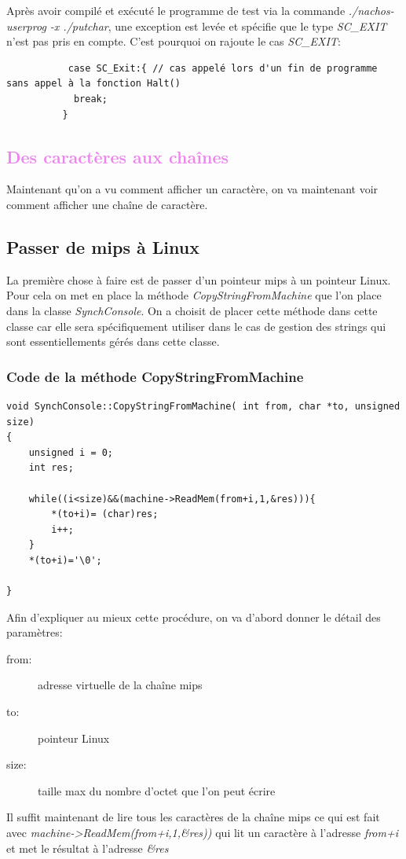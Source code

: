 \documentclass[a4paper,10pt]{report}
\begin{document}
Après avoir compilé et exécuté le programme de test via la commande \emph{./nachos-userprog -x ./putchar}, une exception est levée et spécifie que le type
\emph{SC\_EXIT} n'est pas pris en compte. C'est pourquoi on rajoute le cas \emph{SC\_EXIT}:
\begin{lstlisting}
           case SC_Exit:{ // cas appelé lors d'un fin de programme sans appel à la fonction Halt()
            break;
          }
\end{lstlisting}
\newpage
  \textcolor{Violet}{\section{Des caractères aux chaînes}}
  Maintenant qu'on a vu comment afficher un caractère, on va maintenant voir comment afficher une chaîne de caractère. 
  \textcolor{NavyBlue}{\subsection{Passer de mips à Linux}}
  La première chose à faire est de passer d'un pointeur mips à un pointeur Linux. Pour cela on met en place la méthode \emph{CopyStringFromMachine} que l'on place
  dans la classe \emph{SynchConsole}. On a choisit de placer cette méthode dans cette classe car elle sera spécifiquement utiliser dans le cas de gestion 
  des strings qui sont essentiellements gérés dans cette classe.
  \textcolor{TealBlue}{\subsubsection*{Code de la méthode CopyStringFromMachine}}
  \begin{lstlisting}
void SynchConsole::CopyStringFromMachine( int from, char *to, unsigned size)
{
	unsigned i = 0;
	int res;

	while((i<size)&&(machine->ReadMem(from+i,1,&res))){
		*(to+i)= (char)res;
		i++;
	}
	*(to+i)='\0';

}   
  \end{lstlisting}
  Afin d'expliquer au mieux cette procédure, on va d'abord donner le détail des paramètres:
 \begin{description}
  \item[from:] adresse virtuelle de la chaîne mips
  \item[to:] pointeur Linux
  \item[size:] taille max du nombre d'octet que l'on peut écrire
 \end{description}
 Il suffit maintenant de lire tous les caractères de la chaîne mips ce qui est fait avec \emph{machine->ReadMem(from+i,1,\&res))} qui lit un caractère à l'adresse
 \emph{from+i} et met le résultat à l'adresse \emph{\&res}
 
\end{document}
